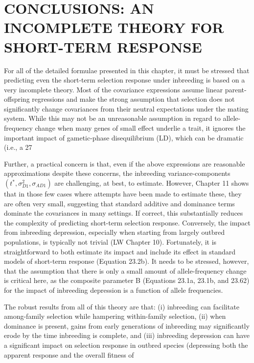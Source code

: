 \documentclass{article}
\begin{document}
\section{CONCLUSIONS: AN INCOMPLETE THEORY FOR SHORT-TERM RESPONSE}
For all of the detailed formulae presented in this chapter, it must be stressed that predicting even the short-term selection response under inbreeding is based on a very incomplete theory. Most of the covariance expressions assume linear parent-offspring regressions and make the strong assumption that selection does not significantly change covariances from their neutral expectations under the mating system. While this may not be an unreasonable assumption in regard to allele-frequency change when many genes of small effect underlie a trait, it ignores the important impact of gametic-phase disequilibrium (LD), which can be dramatic (i.e., a 27%

Further, a practical concern is that, even if the above expressions are reasonable approximations despite these concerns, the inbreeding variance-components  $ (t^{*}, \sigma_{D1}^{2}, \sigma_{AD1}) $ are challenging, at best, to estimate. However, Chapter 11 shows that in those few cases where attempts have been made to estimate these, they are often very small, suggesting that standard additive and dominance terms dominate the covariances in many settings. If correct, this substantially reduces the complexity of predicting short-term selection response. Conversely, the impact from inbreeding depression, especially when starting from largely outbred populations, is typically not trivial (LW Chapter 10). Fortunately, it is straightforward to both estimate its impact and include its effect in standard models of short-term response (Equation 23.2b). It needs to be stressed, however, that the assumption that there is only a small amount of allele-frequency change is critical here, as the composite parameter B (Equations 23.1a, 23.1b, and 23.62) for the impact of inbreeding depression is a function of allele frequencies.

The robust results from all of this theory are that: (i) inbreeding can facilitate among-family selection while hampering within-family selection, (ii) when dominance is present, gains from early generations of inbreeding may significantly erode by the time inbreeding is complete, and (iii) inbreeding depression can have a significant impact on selection response in outbred species (depressing both the apparent response and the overall fitness of
\end{document}

